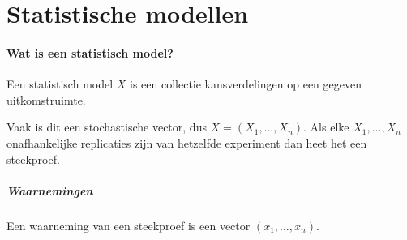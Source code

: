 \section{Statistische modellen}
\paragraph{Wat is een statistisch model?} Een statistisch model \(X\) is een collectie kansverdelingen op een gegeven uitkomstruimte.

Vaak is dit een stochastische vector, dus \(X=(X_{1},\dots,X_{n})\). Als elke \(X_{1},\dots,X_{n}\) onafhankelijke replicaties zijn van hetzelfde experiment dan heet het een steekproef.

\subparagraph{Waarnemingen} Een waarneming van een steekproef is een vector \((x_{1},\dots,x_{n})\).